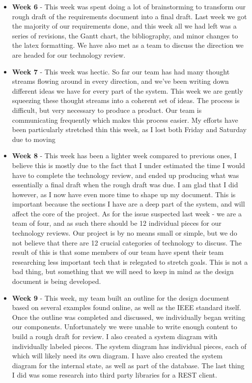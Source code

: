 \documentclass[onecolumn, draftclsnofoot,10pt, compsoc]{IEEEtran}
\begin{document}
\begin{itemize}
					\item \textbf{Week 6} - This week was spent doing a lot of brainstorming to transform our rough draft of the requirements document into a final draft. Last week we got the majority of our requirements done, and this week all we had left was a series of revisions, the Gantt chart, the bibliography, and minor changes to the latex formatting. We have also met as a team to discuss the direction we are headed for our technology review. 
					\item \textbf{Week 7} - This week was hectic. So far our team has had many thought streams flowing around in every direction, and we've been writing down different ideas we have for every part of the system. This week we are gently squeezing these thought streams into a coherent set of ideas. The process is difficult, but very necessary to produce a product. Our team is communicating frequently which makes this process easier. My efforts have been particularly stretched thin this week, as I lost both Friday and Saturday due to moving 
					\item \textbf{Week 8} - This week has been a lighter week compared to previous ones, I believe this is mostly due to the fact that I under estimated the time I would have to complete the technology review, and ended up producing what was essentially a final draft when the rough draft was due. I am glad that I did however, as I now have even more time to shape up my document. This is important because the sections I have are a deep part of the system, and will affect the core of the project. As for the issue suspected last week - we are a team of four, and as such there should be 12 individual pieces for our technology reviews. Our project is by no means small or simple, but we do not believe that there are 12 crucial categories of technology to discuss. The result of this is that some members of our team have spent their team researching less important tech that is relegated to stretch goals. This is not a bad thing, but something that we will need to keep in mind as the design document is being developed. 
					\item \textbf{Week 9} - This week, my team built an outline for the design document based on several examples found online, as well as the IEEE standard itself. Once the outline was completed and discussed, we individually began writing our components. Unfortunately we were unable to write enough content to build a rough draft for review. I also created a system diagram with individually labeled pieces. The system diagram has individual pieces, each of which will likely need its own diagram. I have also created the system diagram for the internal state, as well as part of the database. The last thing I did was some research into third party libraries for a REST client. 

\end{itemize}
\end{document}
